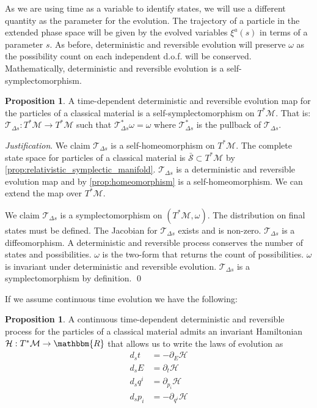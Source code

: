 \documentclass[aps,pra,10pt,twocolumn,floatfix,nofootinbib]{revtex4-1}
\numberwithin{equation}{section}
\theoremstyle{definition}
\newtheorem{prop}[equation]{Proposition}
\newenvironment{justification}{\emph{Justification}.}{\qed}
\begin{document}
As we are using time as a variable to identify states, we will use a different quantity as the parameter for the evolution. The trajectory of a particle in the extended phase space will be given by the evolved variables $\xi^a(s)$ in terms of a parameter $s$. As before, deterministic and reversible evolution will preserve $\omega$ as the possibility count on each independent d.o.f. will be conserved. Mathematically, deterministic and reversible evolution is a self-symplectomorphism.

\begin{prop}\label{prop:relativistic_symplectomorphism}
	A time-dependent deterministic and reversible evolution map for the particles of a classical material is a self-symplectomorphism on $T^*\mathcal{M}$. That is: $\mathcal{T}_{\Delta s}: T^*\mathcal{M} \rightarrow T^*\mathcal{M}$ such that $\mathcal{T}_{\Delta s}^*\omega = \omega$ where $\mathcal{T}_{\Delta s}^*$ is the pullback of $\mathcal{T}_{\Delta s}$.
\end{prop}

\begin{justification}
	We claim $\mathcal{T}_{\Delta s}$ is a self-homeomorphism on $T^*\mathcal{M}$. The complete state space for particles of a classical material is $\bar{\mathcal{S}} \subset T^*\mathcal{M}$ by \ref{prop:relativistic_symplectic_manifold}. $\mathcal{T}_{\Delta s}$ is a deterministic and reversible evolution map and by \ref{prop:homeomorphism} is a self-homeomorphism. We can extend the map over $T^*\mathcal{M}$.
	
	We claim $\mathcal{T}_{\Delta s}$ is a symplectomorphism on $(T^*\mathcal{M}, \omega)$. The distribution on final states must be defined. The Jacobian for $\mathcal{T}_{\Delta s}$ exists and is non-zero. $\mathcal{T}_{\Delta s}$ is a diffeomorphism. A deterministic and reversible process conserves the number of states and possibilities. $\omega$ is the two-form that returns the count of possibilities. $\omega$ is invariant under deterministic and reversible evolution. $\mathcal{T}_{\Delta s}$ is a symplectomorphism by definition.
\end{justification}

If we assume continuous time evolution we have the following:

\begin{prop}\label{prop:relativistic_hamiltons_equations}
	A continuous time-dependent deterministic and reversible process for the particles of a classical material admits an invariant Hamiltonian $\mathcal{H}: T^*\mathcal{M} \rightarrow \mathbbm{R}$ that allows us to write the laws of evolution as
	\begin{align*}
	d_{s}t &= - \partial_{E} \mathcal{H} \\
	d_{s}E &= \partial_{t} \mathcal{H} \\
	d_{s}q^i &= \partial_{p_i} \mathcal{H} \\
	d_{s}p_i &= - \partial_{q^i} \mathcal{H}
	\end{align*}
\end{prop}
\end{document}
